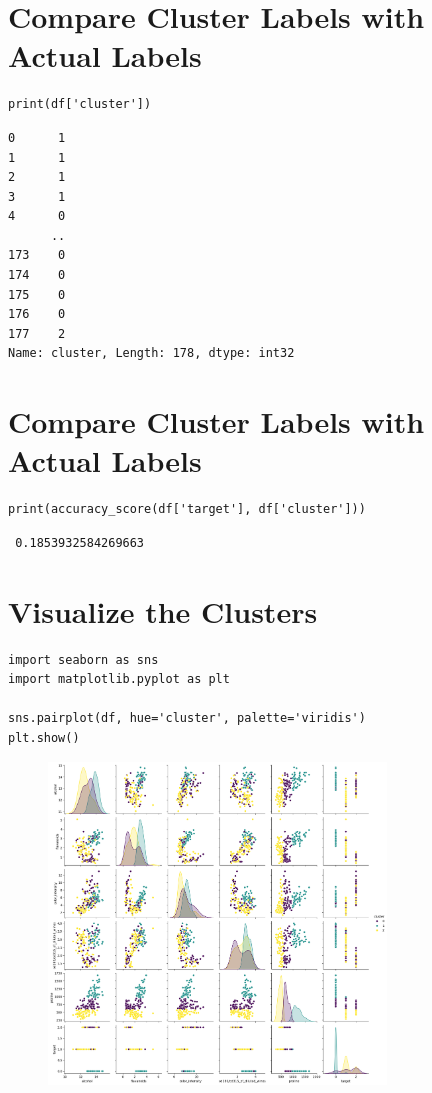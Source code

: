 \section{ Compare Cluster Labels with Actual Labels}
\begin{lstlisting}
print(df['cluster'])
\end{lstlisting}
\newpage
\begin{verbatim}
0      1
1      1
2      1
3      1
4      0
      ..
173    0
174    0
175    0
176    0
177    2
Name: cluster, Length: 178, dtype: int32                

\end{verbatim}
\section{Compare Cluster Labels with Actual Labels}
\begin{lstlisting}
print(accuracy_score(df['target'], df['cluster']))
\end{lstlisting}
\begin{verbatim}
 0.1853932584269663                

\end{verbatim}
\section{Visualize the Clusters}
\begin{lstlisting}
import seaborn as sns
import matplotlib.pyplot as plt

sns.pairplot(df, hue='cluster', palette='viridis')
plt.show()
\end{lstlisting}

\newpage

\begin{figure}[h!]
    \centering
    \includegraphics[width=0.8\textwidth]{download.png}
    \caption{}
     \label{}
\end{figure}            


